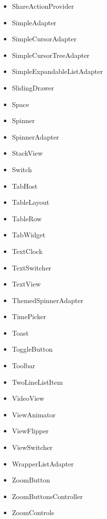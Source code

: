 \documentclass[a4paper,14pt]{extarticle} %
\begin{document}
\begin{itemize}
        \item ShareActionProvider
        \item SimpleAdapter
        \item SimpleCursorAdapter
        \item SimpleCursorTreeAdapter
        \item SimpleExpandableListAdapter
        \item SlidingDrawer
        \item Space
        \item Spinner
        \item SpinnerAdapter
        \item StackView
        \item Switch
        \item TabHost
        \item TableLayout
        \item TableRow
        \item TabWidget
        \item TextClock
        \item TextSwitcher
        \item TextView
        \item ThemedSpinnerAdapter
        \item TimePicker
        \item Toast
        \item ToggleButton
        \item Toolbar
        \item TwoLineListItem
        \item VideoView
        \item ViewAnimator
        \item ViewFlipper
        \item ViewSwitcher
        \item WrapperListAdapter
        \item ZoomButton
        \item ZoomButtonsController
        \item ZoomControls
	\end{itemize}
\end{document}
